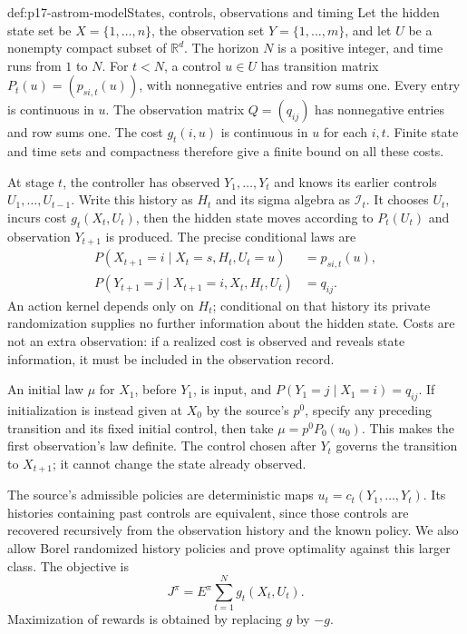 \begin{hbdefinition}{def:p17-astrom-model}{States, controls, observations and timing}
Let the hidden state set be \(X=\{1,\ldots,n\}\), the observation
set \(Y=\{1,\ldots,m\}\), and let \(U\) be a nonempty compact
subset of \(\mathbb R^d\). The horizon \(N\) is a positive integer,
and time runs from \(1\) to \(N\).
For \(t<N\), a control \(u\in U\) has transition matrix
\(P_t(u)=(p_{si,t}(u))\), with nonnegative entries and row
sums one. Every entry is continuous in \(u\).
The observation matrix \(Q=(q_{ij})\) has nonnegative entries
and row sums one. The cost \(g_t(i,u)\) is continuous in \(u\)
for each \(i,t\). Finite state and time sets and compactness
therefore give a finite bound on all these costs.

At stage \(t\), the controller has observed \(Y_1,\ldots,Y_t\)
and knows its earlier controls \(U_1,\ldots,U_{t-1}\).
Write this history as \(H_t\) and its sigma algebra as
\(\mathcal I_t\). It chooses \(U_t\), incurs cost
\(g_t(X_t,U_t)\), then the hidden state moves according to
\(P_t(U_t)\) and observation \(Y_{t+1}\) is produced.
The precise conditional laws are
\[
 \begin{split}
 P(X_{t+1}=i\mid X_t=s,H_t,U_t=u)&=p_{si,t}(u),\\
 P(Y_{t+1}=j\mid X_{t+1}=i,X_t,H_t,U_t)&=q_{ij}.
 \end{split}
\]
An action kernel depends only on \(H_t\); conditional on that
history its private randomization supplies no further information
about the hidden state. Costs are not an extra observation:
if a realized cost is observed and reveals state information,
it must be included in the observation record.

An initial law \(\mu\) for \(X_1\), before \(Y_1\), is input,
and \(P(Y_1=j\mid X_1=i)=q_{ij}\).
If initialization is instead given at \(X_0\) by the source's
\(p^0\), specify any preceding transition and its fixed
initial control, then take \(\mu=p^0P_0(u_0)\).
This makes the first observation's law definite.
The control chosen after \(Y_t\) governs the transition
to \(X_{t+1}\); it cannot change the state already observed.

The source's admissible policies are deterministic maps
\(u_t=c_t(Y_1,\ldots,Y_t)\). Its histories containing past
controls are equivalent, since those controls are recovered
recursively from the observation history and the known policy.
We also allow Borel randomized history policies and prove
optimality against this larger class.
The objective is
\[
                     J^\pi=E^\pi\sum_{t=1}^N g_t(X_t,U_t).
\]
Maximization of rewards is obtained by replacing \(g\) by \(-g\).
\end{hbdefinition}

